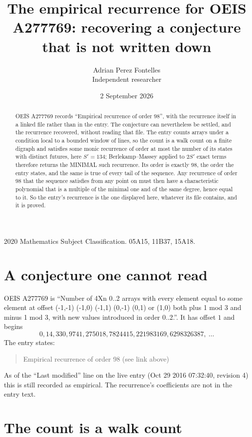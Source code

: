 \documentclass[11pt,a4paper]{article}
\title{The empirical recurrence for OEIS A277769: recovering a conjecture that is not written down}
\author{Adrian Perez Fontelles\\ \small Independent researcher}
\date{2 September 2026}
\theoremstyle{plain}
\theoremstyle{definition}
\begin{document}
\maketitle

\begin{abstract}
OEIS A277769 records ``Empirical recurrence of order $98$'', with the recurrence itself in a
linked file rather than in the entry. The conjecture can nevertheless be settled, and the
recurrence recovered, without reading that file. The entry counts arrays under a condition
local to a bounded window of lines, so the count is a walk count on a finite digraph and
satisfies some monic recurrence of order at most the number of its states with distinct
futures, here $S'=134$; Berlekamp--Massey applied to $2S'$ exact
terms therefore returns the MINIMAL such recurrence. Its order is exactly $98$, the order
the entry states, and the same is true of every tail of the sequence. Any recurrence of order
$98$ that the sequence satisfies from any point on must then have a characteristic
polynomial that is a multiple of the minimal one and of the same degree, hence equal to it. So
the entry's recurrence is the one displayed here, whatever its file contains, and it is
proved.
\end{abstract}

\noindent\small 2020 Mathematics Subject Classification. 05A15, 11B37, 15A18.\normalsize

\section{A conjecture one cannot read}

OEIS A277769 is ``Number of 4Xn 0..2 arrays with every element equal to some element at offset (-1,-1) (-1,0) (-1,1) (0,-1) (0,1) or (1,0) both plus 1 mod 3 and minus 1 mod 3, with new values introduced in order 0..2.''. It has offset $1$ and begins
\[
0, 14, 330, 9741, 275018, 7824415, 221983169, 6298326387,\ \dots
\]
The entry states:
\begin{quote}
Empirical recurrence of order 98 (see link above)
\end{quote}
As of the ``Last modified'' line on the live entry (Oct 29 2016 07:32:40, revision 4) this is still
recorded as empirical. The recurrence's coefficients are not in the entry text.

\section{The count is a walk count}
\end{document}
